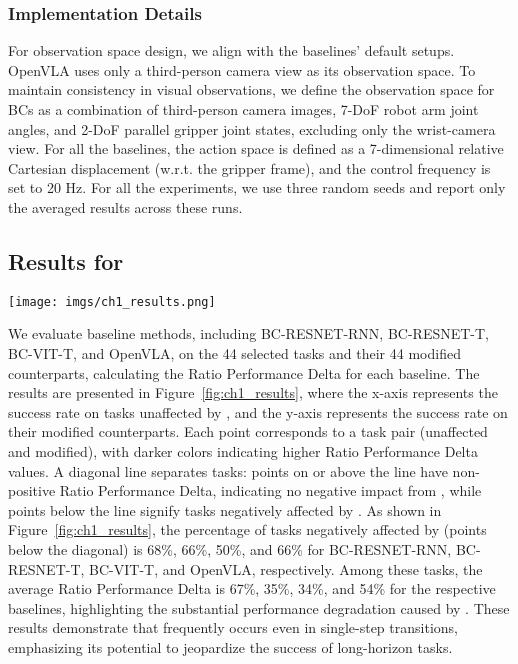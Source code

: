 \subsubsection{Implementation Details}
For observation space design, we align with the baselines' default setups. OpenVLA uses only a third-person camera view as its observation space. To maintain consistency in visual observations, we define the observation space for BCs as a combination of third-person camera images, 7-DoF robot arm joint angles, and 2-DoF parallel gripper joint states, excluding only the wrist-camera view. For all the baselines, the action space is defined as a 7-dimensional relative Cartesian displacement (w.r.t. the gripper frame), and the control frequency is set to 20 Hz. For all the experiments, we use three random seeds and report only the averaged results across these runs.











\subsection{Results for \bma}
\label{subsec:results_bma}

% 
\begin{figure*}[ht]
    \centering
    \texttt{[image: imgs/ch1\_results.png]} 
    \caption{This figure presents the results for \bma. In each baseline subfigure, the majority of points lie below the diagonal line, representing tasks with a positive Ratio Performance Delta, indicating that single predicate modification negatively affects tasks performance.}
    \label{fig:ch1_results}
    \vspace{-1.5em}
\end{figure*}


We evaluate baseline methods, including BC-RESNET-RNN, BC-RESNET-T, BC-VIT-T, and OpenVLA, on the 44 selected tasks and their 44 modified counterparts, calculating the Ratio Performance Delta for each baseline. The results are presented in Figure~\ref{fig:ch1_results}, where the x-axis represents the success rate on tasks unaffected by \pb, and the y-axis represents the success rate on their modified counterparts. Each point corresponds to a task pair (unaffected and modified), with darker colors indicating higher Ratio Performance Delta values. A diagonal line separates tasks: points on or above the line have non-positive Ratio Performance Delta, indicating no negative impact from \pb, while points below the line signify tasks negatively affected by \pb. As shown in Figure~\ref{fig:ch1_results}, the percentage of tasks negatively affected by \pb (points below the diagonal) is 68\%, 66\%, 50\%, and 66\% for BC-RESNET-RNN, BC-RESNET-T, BC-VIT-T, and OpenVLA, respectively. Among these tasks, the average Ratio Performance Delta is 67\%, 35\%, 34\%, and 54\% for the respective baselines, highlighting the substantial performance degradation caused by \pb. These results demonstrate that \pb frequently occurs even in single-step transitions, emphasizing its potential to jeopardize the success of long-horizon tasks.

